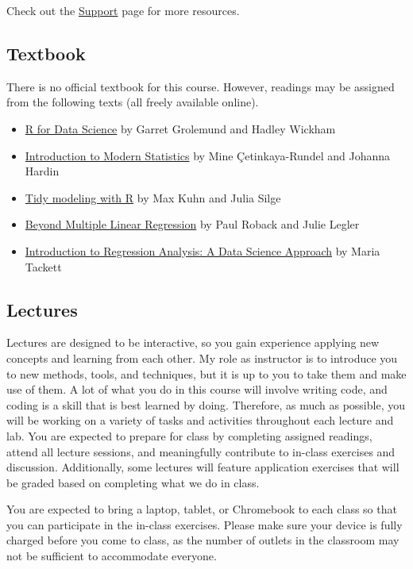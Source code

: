 \documentclass[
  letterpaper,
  DIV=11,
  numbers=noendperiod]{scrartcl}
\begin{document}
Check out the \href{support.qmd}{Support} page for more resources.

\subsection{Textbook}\label{textbook}

There is no official textbook for this course. However, readings may be
assigned from the following texts (all freely available online).

\begin{itemize}
\item
  \href{https://r4ds.had.co.nz/}{R for Data Science} by Garret Grolemund
  and Hadley Wickham
\item
  \href{https://openintro-ims.netlify.app/}{Introduction to Modern
  Statistics} by Mine Çetinkaya-Rundel and Johanna Hardin
\item
  \href{https://www.tmwr.org/}{Tidy modeling with R} by Max Kuhn and
  Julia Silge
\item
  \href{https://bookdown.org/roback/bookdown-BeyondMLR/}{Beyond Multiple
  Linear Regression} by Paul Roback and Julie Legler
\item
  \href{https://introregression.netlify.app/}{Introduction to Regression
  Analysis: A Data Science Approach} by Maria Tackett
\end{itemize}

\subsection{Lectures}\label{lectures}

Lectures are designed to be interactive, so you gain experience applying
new concepts and learning from each other. My role as instructor is to
introduce you to new methods, tools, and techniques, but it is up to you
to take them and make use of them. A lot of what you do in this course
will involve writing code, and coding is a skill that is best learned by
doing. Therefore, as much as possible, you will be working on a variety
of tasks and activities throughout each lecture and lab. You are
expected to prepare for class by completing assigned readings, attend
all lecture sessions, and meaningfully contribute to in-class exercises
and discussion. Additionally, some lectures will feature application
exercises that will be graded based on completing what we do in class.

You are expected to bring a laptop, tablet, or Chromebook to each class
so that you can participate in the in-class exercises. Please make sure
your device is fully charged before you come to class, as the number of
outlets in the classroom may not be sufficient to accommodate everyone.
\end{document}
